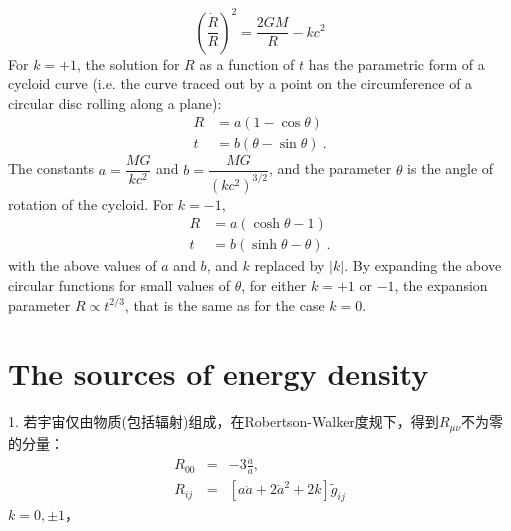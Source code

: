 \documentclass[12pt,a4paper]{article}
\begin{document}
$$ \left(\dfrac{\dot{R}}{R} \right)^2 = \dfrac{2GM}{R} -kc^2$$
For $k = +1$, the solution for $R$ as a function of $t$ has the parametric form of a cycloid curve (i.e. the curve traced out by a point on the circumference of a circular disc rolling along a plane):
\begin{align*}
R &= a(1-\cos \theta) \\
t &= b(\theta -\sin \theta) ~.
\end{align*}
The constants $a = \dfrac{MG}{kc^2}$ and $b = \dfrac{MG}{(kc^2)^{3/2}}$, and the parameter $\theta$ is the angle of rotation of the cycloid. For $k = -1$,
\begin{align*}
R &= a(\cosh \theta -1) \\
t &= b(\sinh \theta - \theta) ~.
\end{align*}
with the above values of $a$ and $b$, and $k$ replaced by $|k|$. By expanding the above circular functions for small values of $\theta$, for either $k = +1$ or $-1$, the expansion parameter $R \propto t^{2/3}$, that is the same as for the case $k = 0$.
 






























































\section{The sources of energy density}
\cite{2010宇宙大尺度结构的形成, 2012宇宙大尺度结构的形成} 1. 若宇宙仅由物质(包括辐射)组成，在Robertson-Walker度规下，得到$R_{\mu\nu}$不为零的分量：
\begin{eqnarray}
R_{00} &=& -3\frac{\ddot{a}}{a}, \\
R_{ij}   &=& [a\ddot{a} +2\dot{a}^2 +2k] \tilde{g}_{ij}
\end{eqnarray}
$k = 0, \pm 1$，
\end{document}

